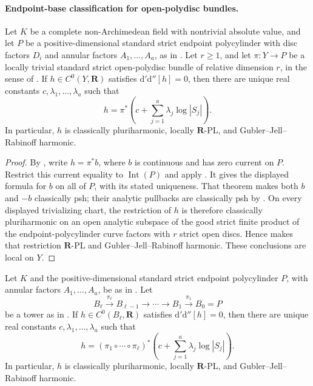 \paragraph{Endpoint-base classification for open-polydisc bundles.}
\begin{proposition}
\label{prop:p062-open-polydisc-bundle-endpoint-base}
Let \(K\) be a complete non-Archimedean field with nontrivial absolute
value, and let \(P\) be a positive-dimensional standard strict endpoint
polycylinder with disc factors \(D_i\) and annular factors
\(A_1,\ldots,A_a\), as in .
Let \(r\geq1\), and let \(\pi:Y\to P\) be a locally trivial standard
strict open-polydisc bundle of relative dimension \(r\), in the sense of
.  If
\(h\in C^0(Y,\mathbf R)\) satisfies
\(\mathrm d'\mathrm d''[h]=0\), then there are unique real constants
\(c,\lambda_1,\ldots,\lambda_a\) such that
\[
                  h=\pi^*\left(c+\sum_{j=1}^a\lambda_j\log|S_j|\right).
\]
In particular, \(h\) is classically pluriharmonic, locally
\(\mathbf R\)-PL, and Gubler--Jell--Rabinoff harmonic.
\end{proposition}

\begin{proof}
By , write \(h=\pi^*b\),
where \(b\) is continuous and has zero current on \(P\).  Restrict this
current equality to \(\operatorname{Int}(P)\) and apply
.  It gives the displayed
formula for \(b\) on all of \(P\), with its stated uniqueness.  That theorem
makes both \(b\) and \(-b\) classically psh; their analytic pullbacks are
classically psh by \cite[Proposition~4.2(6)]{GR25Classical}.  On every
displayed trivializing chart, the restriction of \(h\) is therefore
classically pluriharmonic on an open analytic subspace of the good strict
finite product of the endpoint-polycylinder curve factors with \(r\) strict
open discs.  Hence
 makes that restriction
\(\mathbf R\)-PL and Gubler--Jell--Rabinoff harmonic.  These conclusions
are local on \(Y\).
\end{proof}

\begin{corollary}
\label{cor:p062-iterated-endpoint-open-polydisc-bundles}
Let \(K\) and the positive-dimensional standard strict endpoint polycylinder
\(P\), with annular factors \(A_1,\ldots,A_a\), be as in
.  Let
\[
 B_\ell\xrightarrow{\pi_\ell}B_{\ell-1}
 \longrightarrow\cdots\longrightarrow B_1
 \xrightarrow{\pi_1}B_0=P
\]
be a tower as in
.  If
\(h\in C^0(B_\ell,\mathbf R)\) satisfies
\(\mathrm d'\mathrm d''[h]=0\), then there are unique real constants
\(c,\lambda_1,\ldots,\lambda_a\) such that
\[
 h=(\pi_1\circ\cdots\circ\pi_\ell)^*
 \left(c+\sum_{j=1}^{a}\lambda_j\log|S_j|\right).
\]
In particular, \(h\) is classically pluriharmonic, locally
\(\mathbf R\)-PL, and Gubler--Jell--Rabinoff harmonic.
\end{corollary}

